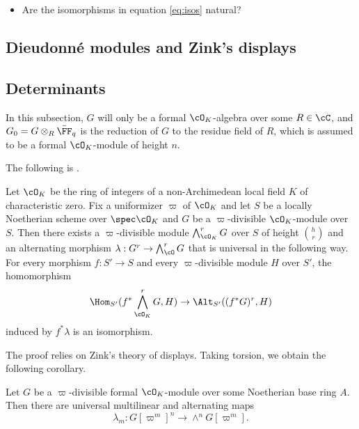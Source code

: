 \documentclass[../main.tex]{subfiles}
\begin{document}
\begin{itemize}
    \item Are the isomorphisms in equation \ref{eq:isos} natural?
\end{itemize}
\color{black}


\subsection{Dieudonn\'e modules and Zink's displays} %
\label{sub:The Dieudonne-module}


\subsection{Determinants} %
\label{sub:Determinants}
In this subsection, $G$ will only be a formal $\cO_K$-algebra over some
$R \in \cC$, and $G_0 = G \otimes_R \bar \FF_q$ is the reduction of $G$
to the residue field of $R$, which is assumed to be a formal $\cO_K$-module
of height $n$.

The following is \cite[Theorem 4.34]{hedayatzadeh2015det}.
\begin{prop}
    Let $\cO_K$ be the ring of integers of a non-Archimedean local field $K$ of
    characteristic zero. Fix a uniformizer $\varpi$ of $\cO_K$ and let $S$ be a
    locally Noetherian scheme over $\spec \cO_K$ and $G$ be a
    $\varpi$-divisible $\cO_K$-module over $S$. Then there exists a
    $\varpi$-divisible module $\bigwedge_{\cO_K}^r G$ over $S$ of height $\binom
    hr$ and an alternating morphism $\lambda: G^r \to \bigwedge^r_\cO G$
    that is universal in the following way. For every morphism $f: S' \to S$
    and every $\varpi$-divisible module $H$ over $S'$, the
    homomorphism 
    \begin{equation*}
        \Hom_{S'}(f^* \bigwedge^r_{\cO_K} G, H) \to
        \Alt_{S'}((f^*G)^r, H)
    \end{equation*}
    induced by $f^*\lambda$ is an isomorphism.
\end{prop}
The proof relies on Zink's theory of displays. 
Taking torsion, we obtain the following corollary.

\begin{cor}\label{cor:findetmaps}
    Let $G$ be a $\varpi$-divisible formal $\cO_K$-module over some Noetherian 
    base ring $A$.
    Then there are universal multilinear and alternating maps 
    \begin{equation*}
        \lambda_m: G[\varpi^m]^n \to \wedge^n G[\varpi^m].
    \end{equation*}
\end{cor}
\end{document}
